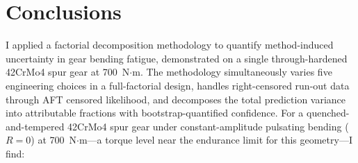 \documentclass[12pt,a4paper]{article}
\begin{document}
\section{Conclusions}
\label{sec:conclusions}

I applied a factorial decomposition methodology to quantify
method-induced uncertainty in gear bending fatigue, demonstrated
on a single through-hardened 42CrMo4 spur gear at 700~N$\cdot$m.
The methodology
simultaneously varies five engineering choices in a full-factorial
design, handles right-censored run-out data through AFT censored
likelihood, and decomposes the total prediction variance into
attributable fractions with bootstrap-quantified confidence. For a
quenched-and-tempered 42CrMo4 spur gear under constant-amplitude
pulsating bending ($R=0$) at 700~N$\cdot$m---a torque level near the
endurance limit for this geometry---I find:
\end{document}

